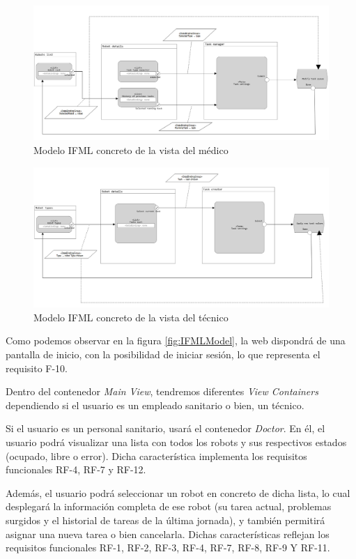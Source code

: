 \begin{figure}
	\centering
	\includegraphics[width=1\textwidth]{images/Doctor-IFML.PNG}
	\caption{Modelo IFML concreto de la vista del médico}
	\label{fig:IFMLDoctor}
\end{figure}

\begin{figure}
	\centering
	\includegraphics[width=1\textwidth]{images/Tech-IFML.PNG}
	\caption{Modelo IFML concreto de la vista del técnico}
	\label{fig:IFMLTech}
\end{figure}

Como podemos observar en la figura \ref{fig:IFMLModel}, la web dispondrá de una pantalla de inicio, con la posibilidad de iniciar sesión, lo que representa el requisito F-10.

Dentro del contenedor \textit{Main View}, tendremos diferentes \textit{View Containers} dependiendo si el usuario es un empleado sanitario o bien, un técnico.

Si el usuario es un personal sanitario, usará el contenedor \textit{Doctor}. En él, el usuario podrá visualizar una lista con todos los robots y sus respectivos estados (ocupado, libre o error). Dicha característica implementa los requisitos funcionales RF-4, RF-7 y RF-12. 

Además, el usuario podrá seleccionar un robot en concreto de dicha lista, lo cual desplegará la información completa de ese robot (su tarea actual, problemas surgidos y el historial de tareas de la última jornada), y también permitirá asignar una nueva tarea o bien cancelarla. Dichas características reflejan los requisitos funcionales RF-1, RF-2, RF-3, RF-4, RF-7, RF-8, RF-9 Y RF-11.

